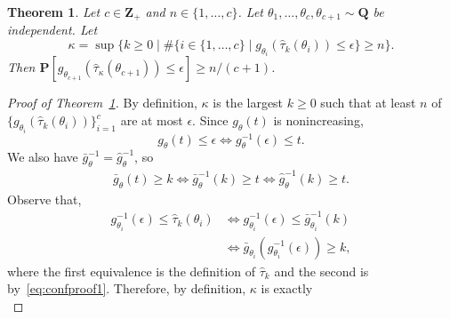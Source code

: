 \documentclass[10pt,a4paper]{amsart}
\newtheorem{theorem}{Theorem}
\newcommand{\Prob}{\mathbf{P}}
\newcommand{\Z}{\mathbf{Z}}
\newcommand{\bnote}[1]{}
\newcommand{\cardinality}{\#}
\newcommand{\change}[1]{#1}
\newcommand{\lt}{\kappa}
\newcommand{\ncalib}{c}
\newcommand{\param}{\theta}
\newcommand{\paramdist}{\mathbf{Q}}
\newcommand{\predgap}{\hat{g}}
\newcommand{\pst}{\hat{\tau}}
\newcommand{\rollmin}{\bar{g}}
\newcommand{\tol}{\epsilon}
\newcommand{\truegap}{g}
\begin{document}
\begin{theorem} \label{thm:conformal}
    Let $\ncalib \in \Z_+$ and $n \in \{1, \dots, \ncalib\}$.
    Let $\param_1, \dots, \param_\ncalib, \param_{\ncalib+1} \sim \paramdist$ be independent.
    Let
    \begin{equation*}
        \lt = \sup \{ k \ge 0 \mid \#\{i \in \{1, \dots, \ncalib\} \mid \truegap_{\param_i}(\pst_k(\param_i)) \le \tol\} \ge n\}.
    \end{equation*}
    Then $\Prob[\truegap_{\param_{\ncalib+1}}(\pst_{\lt}(\param_{\ncalib+1})) \le \tol] \ge \change{n}/(\ncalib + 1)$.
\end{theorem}

\begin{proof}[Proof of Theorem~\ref{thm:conformal}]
    By definition, $\lt$ is the largest $k \ge 0$ such that at least $n$ of $\{\truegap_{\param_i}(\pst_k(\param_i))\}_{i=1}^\ncalib$ are at most $\tol$.
    Since $\truegap_\param(t)$ is nonincreasing,
    $$
    \truegap_\param(t) \le \tol \iff \truegap_\param^{-1}(\tol) \le t.
    $$
    We also have $\rollmin_\param^{-1} = \predgap_\param^{-1}$, so
    \begin{align}
        \rollmin_\param(t) \ge k \iff \rollmin_\param^{-1}(k) \ge t \iff \predgap_\param^{-1}(k) \ge t. \label{eq:confproof1}
    \end{align}
    Observe that,
    \begin{align*}
    \truegap_{\param_i}^{-1}(\tol) \le \pst_k(\param_i) &\iff \truegap_{\param_i}^{-1}(\tol) \le \rollmin_{\param_i}^{-1}(k) \\&\iff \rollmin_{\param_i}(\truegap_{\param_i}^{-1}(\tol)) \ge k,
    \end{align*}
    where the first equivalence is the definition of $\pst_k$ and the second is by~\eqref{eq:confproof1}.
    Therefore, by definition, $\lt$ is exactly
    \begin{equation*}

\end{equation*}
\end{proof}
\end{document}
